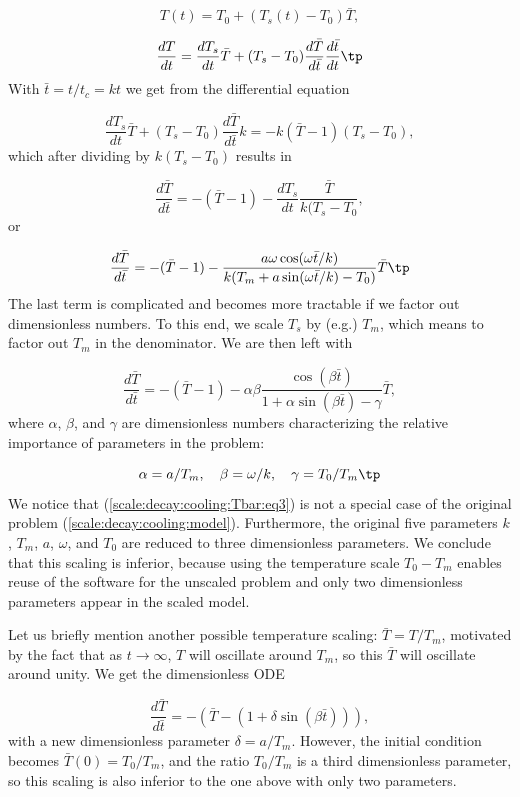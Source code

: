 \documentclass[graybox,envcountchap,sectrefs,final]{svmonodo}
\begin{document}
\[ T(t) = T_0 + (T_s(t)-T_0)\bar T,\]

\[ \frac{dT}{dt} = \frac{dT_s}{dt}\bar T +
(T_s-T_0)\frac{d\bar T}{d\bar t}\frac{d\bar t}{dt}
\tp
\]
With $\bar t = t/t_c = kt$ we get from the differential equation

\[
\frac{dT_s}{dt}\bar T +
(T_s-T_0)\frac{d\bar T}{d\bar t}k
= -k(\bar T - 1)(T_s - T_0),
\]
which after dividing by $k(T_s-T_0)$ results in

\[
\frac{d\bar T}{d\bar t} = -(\bar T - 1) -
\frac{dT_s}{dt}\frac{\bar T}{k(T_s-T_0},
\]
or

\[
\frac{d\bar T}{d\bar t} = -(\bar T - 1) -
\frac{a\omega\cos(\omega \bar t/k)}{k(T_m + a\sin(\omega \bar t/k) -T_0)}\bar T
\tp
\]
The last term is complicated and becomes more tractable if we factor
out dimensionless numbers. To this end, we scale $T_s$ by (e.g.) $T_m$,
which means to factor out $T_m$ in the denominator. We are then
left with

\begin{equation}
\frac{d\bar T}{d\bar t} = -(\bar T - 1) -
\alpha\beta \frac{\cos(\beta \bar t)}{1 + \alpha\sin(\beta\bar t) - \gamma}
\bar T,
\label{scale:decay:cooling:Tbar:eq3}
\end{equation}
where $\alpha$, $\beta$, and $\gamma$ are dimensionless numbers
characterizing the relative importance of parameters in the problem:

\begin{equation}
\alpha=a/T_m,\quad \beta = \omega/k,\quad \gamma = T_0/T_m
\tp
\end{equation}
We notice that (\ref{scale:decay:cooling:Tbar:eq3})
is not a special case of the original problem
(\ref{scale:decay:cooling:model}). Furthermore, the original five
parameters $k$, $T_m$, $a$, $\omega$, and
$T_0$ are reduced to three dimensionless parameters.
We conclude that this scaling is inferior, because
using the temperature scale $T_0-T_m$ enables reuse of the software
for the unscaled problem and only two dimensionless parameters appear
in the scaled model.

Let us briefly mention another possible temperature scaling:
$\bar T = T/T_m$, motivated by the fact that as $t\rightarrow\infty$,
$T$ will oscillate around $T_m$, so this $\bar T$ will oscillate around
unity. We get the dimensionless ODE

\[ \frac{d\bar T}{d\bar t} = -(\bar T - (1 + \delta\sin(\beta\bar t))),\]
with a new dimensionless parameter $\delta = a/T_m$. However, the initial
condition becomes $\bar T(0)=T_0/T_m$, and the ratio $T_0/T_m$ is
a third dimensionless parameter, so this scaling is also inferior to the
one above with only two parameters.
\end{document}
